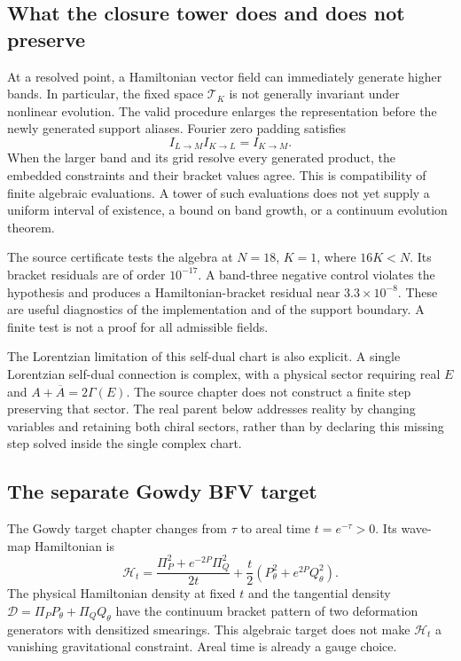 \subsection{What the closure tower does and does not preserve}
At a resolved point, a Hamiltonian vector field can immediately generate higher bands. In particular, the fixed space $\mathcal T_K$ is not generally invariant under nonlinear evolution. The valid procedure enlarges the representation before the newly generated support aliases. Fourier zero padding satisfies
\begin{equation}
 I_{L\to M}I_{K\to L}=I_{K\to M}.
\end{equation}
When the larger band and its grid resolve every generated product, the embedded constraints and their bracket values agree. This is compatibility of finite algebraic evaluations. A tower of such evaluations does not yet supply a uniform interval of existence, a bound on band growth, or a continuum evolution theorem.

The source certificate tests the algebra at $N=18$, $K=1$, where $16K<N$. Its bracket residuals are of order $10^{-17}$. A band-three negative control violates the hypothesis and produces a Hamiltonian-bracket residual near $3.3\times10^{-8}$. These are useful diagnostics of the implementation and of the support boundary. A finite test is not a proof for all admissible fields.

The Lorentzian limitation of this self-dual chart is also explicit. A single Lorentzian self-dual connection is complex, with a physical sector requiring real $E$ and
$A+\overline A=2\Gamma(E)$. The source chapter does not construct a finite step preserving that sector. The real parent below addresses reality by changing variables and retaining both chiral sectors, rather than by declaring this missing step solved inside the single complex chart.

\subsection{The separate Gowdy BFV target}
The Gowdy target chapter changes from $\tau$ to areal time $t=e^{-\tau}>0$. Its wave-map Hamiltonian is
\begin{equation}
 \mathcal H_t=\frac{\Pi_P^2+e^{-2P}\Pi_Q^2}{2t}
                   +\frac t2(P_\theta^2+e^{2P}Q_\theta^2).
\end{equation}
The physical Hamiltonian density at fixed $t$ and the tangential density
$\mathcal D=\Pi_PP_\theta+\Pi_QQ_\theta$ have the continuum bracket pattern of two deformation generators with densitized smearings. This algebraic target does not make $\mathcal H_t$ a vanishing gravitational constraint. Areal time is already a gauge choice.

